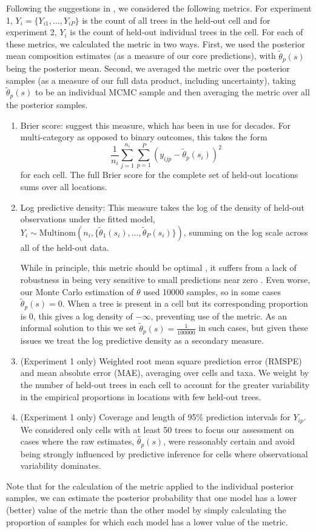 \documentclass[12pt]{article}\usepackage[]{graphicx}\usepackage[]{color}
\begin{document}
Following the suggestions in \cite{Gnei:etal:2007}, we considered
the following metrics. For experiment 1, $Y_{i}=\{Y_{i1},\ldots,Y_{iP}\}$
is the count of all trees in the held-out cell and for experiment
2, $Y_{i}$ is the count of held-out individual trees in the cell.
For each of these metrics, we calculated the metric in two ways. First,
we used the posterior mean composition estimates (as a measure of
our core predictions), with $\tilde{\theta}_{p}(s)$ being the posterior
mean. Second, we averaged the metric over the posterior samples (as
a measure of our full data product, including uncertainty), taking
$\tilde{\theta}_{p}(s)$ to be an individual MCMC sample and then
averaging the metric over all the posterior samples. 
\begin{enumerate}
\item Brier score: \cite{Gnei:etal:2007} suggest this measure, which has
been in use for decades. For multi-category as opposed to binary outcomes,
this takes the form
\[
\frac{1}{n_{i}}\sum_{j=1}^{n_{i}}\sum_{p=1}^{P}(y_{ijp}-\tilde{\theta}_{p}(s_{i}))^{2}
\]
for each cell. The full Brier score for the complete set of held-out
locations sums over all locations.
\item Log predictive density: This measure takes the log of the density
of held-out observations under the fitted model, $Y_{i}\sim\mbox{Multinom}(n_{i},\{\tilde{\theta}_{1}(s_{i}),\ldots,\tilde{\theta}_{P}(s_{i})\})$,
summing on the log scale across all of the held-out data. 


While in principle, this metric should be optimal \citep{Krnj:Drap:2014},
it suffers from a lack of robustness in being very sensitive to small
predictions near zero \citep{Gnei:etal:2007}. Even worse, our Monte
Carlo estimation of $\theta$ used 10000 samples, so in some cases
$\tilde{\theta}_{p}(s)=0$. When a tree is present in a cell but its
corresponding proportion is 0, this gives a log density of $-\infty$,
preventing use of the metric. As an informal solution to this we set
$\tilde{\theta}_{p}(s)=\frac{1}{100000}$ in such cases, but given
these issues we treat the log predictive density as a secondary measure.

\item (Experiment 1 only) Weighted root mean square prediction error (RMSPE)
and mean absolute error (MAE), averaging over cells and taxa. We weight
by the number of held-out trees in each cell to account for the greater
variability in the empirical proportions in locations with few held-out
trees. 
\item (Experiment 1 only) Coverage and length of 95\% prediction intervals
for $Y_{ip}$. We considered only cells with at least 50 trees to
focus our assessment on cases where the raw estimates, $\hat{\theta}_{p}(s)$,
were reasonably certain and avoid being strongly influenced by predictive
inference for cells where observational variability dominates.
\end{enumerate}
Note that for the calculation of the metric applied to the individual
posterior samples, we can estimate the posterior probability that
one model has a lower (better) value of the metric than the other
model by simply calculating the proportion of samples for which each
model has a lower value of the metric.
\end{document}
